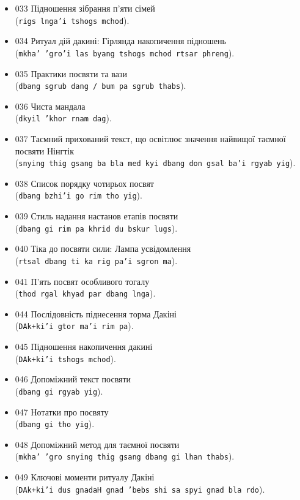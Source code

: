 \documentclass{article}
\begin{document}
\begin{itemize}
\item 033 Підношення зібрання п’яти сімей \\ (\texttt{rigs lnga'i tshogs mchod}).
\item 034 Ритуал дій дакині: Гірлянда накопичення підношень \\ (\texttt{mkha' 'gro'i las byang tshogs mchod rtsar phreng}).
\item 035 Практики посвяти та вази \\ (\texttt{dbang sgrub dang / bum pa sgrub thabs}).
\item 036 Чиста мандала \\ (\texttt{dkyil 'khor rnam dag}).
\item 037 Таємний прихований текст, що освітлює значення найвищої таємної посвяти Нінгтік \\ (\texttt{snying thig gsang ba bla med kyi dbang don gsal ba'i rgyab yig}).
\item 038 Список порядку чотирьох посвят \\ (\texttt{dbang bzhi'i go rim tho yig}).
\item 039 Стиль надання настанов етапів посвяти \\ (\texttt{dbang gi rim pa khrid du bskur lugs}).
\item 040 Тіка до посвяти сили: Лампа усвідомлення \\ (\texttt{rtsal dbang ti ka rig pa'i sgron ma}).
\item 041 П'ять посвят особливого тогалу \\ (\texttt{thod rgal khyad par dbang lnga}).
\item 044 Послідовність піднесення торма Дакіні \\ (\texttt{DAk+ki'i gtor ma'i rim pa}).
\item 045 Підношення накопичення дакині \\ (\texttt{DAk+ki'i tshogs mchod}).
\item 046 Допоміжний текст посвяти \\ (\texttt{dbang gi rgyab yig}).
\item 047 Нотатки про посвяту \\ (\texttt{dbang gi tho yig}).
\item 048 Допоміжний метод для таємної посвяти \\ (\texttt{mkha' 'gro snying thig gsang dbang gi lhan thabs}).
\item 049 Ключові моменти ритуалу Дакіні \\ (\texttt{DAk+ki'i dus gnadaH gnad 'bebs shi sa spyi gnad bla rdo}).

\end{itemize}
\end{document}
